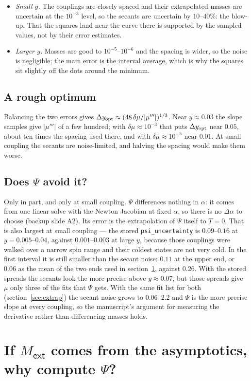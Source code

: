 \documentclass[11pt,a4paper]{article}
\newcommand{\q}[1]{\subsection*{\color{accent}#1}}
\newcommand{\ext}{\mathsf{ext}}
\begin{document}
\begin{itemize}\itemsep3pt
  \item \emph{Small $y$.} The couplings are closely spaced and their
  extrapolated masses are uncertain at the $10^{-3}$ level, so the secants are
  uncertain by $10$--$40\%$: the blow-up. That the squares land near the curve
  there is supported by the sampled values, not by their error estimates.
  \item \emph{Larger $y$.} Masses are good to $10^{-5}$--$10^{-6}$ and the
  spacing is wider, so the noise is negligible; the main error is the interval
  average, which is why the squares sit slightly off the dots around the minimum.
\end{itemize}

\q{A rough optimum}

Balancing the two errors gives
$\Delta y_{\rm opt}\approx(48\,\delta\mu/|\mu'''|)^{1/3}$. Near $y\approx0.03$ the
slope samples give $|\mu'''|$ of a few hundred; with $\delta\mu\approx10^{-3}$
that puts $\Delta y_{\rm opt}$ near $0.05$, about ten times the spacing used
there, and with $\delta\mu\approx10^{-5}$ near $0.01$. At small coupling the
secants are noise-limited, and halving the spacing would make them worse.

\q{Does $\Psi$ avoid it?}

Only in part, and only at small coupling. $\Psi$ differences nothing in
$\alpha$: it comes from one linear solve with the Newton Jacobian at fixed
$\alpha$, so there is no $\Delta\alpha$ to choose (backup slide A2). Its error is
the extrapolation of $\Psi$ itself to $T=0$. That is also largest at small
coupling --- the stored \texttt{psi\_uncertainty} is $0.09$--$0.16$ at
$y=0.005$--$0.04$, against $0.001$--$0.003$ at large $y$, because those couplings
were walked over a narrow spin range and their coldest states are not very cold.
In the first interval it is still smaller than the secant noise: $0.11$ at the
upper end, or $0.06$ as the mean of the two ends used in
section~\ref{sec:whypsi}, against $0.26$. With the stored spreads the secants
look the more precise above $y\approx0.07$, but those spreads give $\mu$ only
three of the fits that $\Psi$ gets. With the same fit list for both
(section~\ref{sec:extrap}) the secant noise grows to $0.06$--$2.2$ and $\Psi$
is the more precise slope at every coupling, so the manuscript's argument for
measuring the derivative rather than differencing masses holds.

\section{If $M_\ext$ comes from the asymptotics, why compute $\Psi$?}
\label{sec:whypsi}
\end{document}

